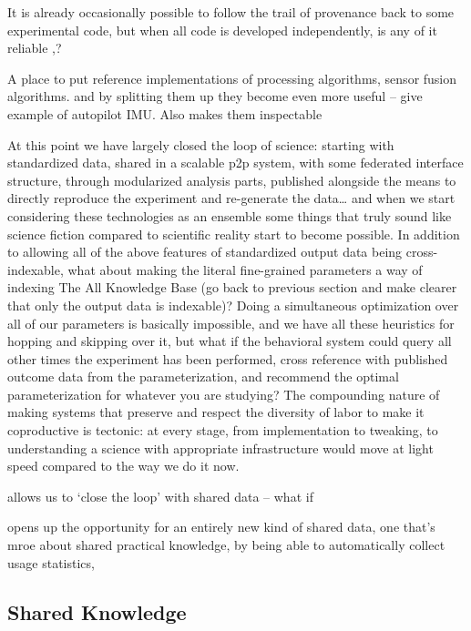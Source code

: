 \documentclass[nohyper]{tufte-book-jls}
\begin{document}
It is already occasionally possible to follow the trail of provenance
back to some experimental code, but when all code is developed
independently, is any of it reliable \cite{wallReliabilityStartsExperimental2018},?
\begin{leftbar}
A place to put reference implementations of processing algorithms,
sensor fusion algorithms. and by splitting them up they become even more
useful -- give example of autopilot IMU. Also makes them inspectable
\end{leftbar}

At this point we have largely closed the loop of science: starting with
standardized data, shared in a scalable p2p system, with some federated
interface structure, through modularized analysis parts, published
alongside the means to directly reproduce the experiment and re-generate
the data\ldots{} and when we start considering these technologies as an
ensemble some things that truly sound like science fiction compared to
scientific reality start to become possible. In addition to allowing all
of the above features of standardized output data being cross-indexable,
what about making the literal fine-grained parameters a way of indexing
The All Knowledge Base (go back to previous section and make clearer
that only the output data is indexable)? Doing a simultaneous
optimization over all of our parameters is basically impossible, and we
have all these heuristics for hopping and skipping over it, but what if
the behavioral system could query all other times the experiment has
been performed, cross reference with published outcome data from the
parameterization, and recommend the optimal parameterization for
whatever you are studying? The compounding nature of making systems that
preserve and respect the diversity of labor to make it coproductive is
tectonic: at every stage, from implementation to tweaking, to
understanding a science with appropriate infrastructure would move at
light speed compared to the way we do it now.

\begin{leftbar}
allows us to `close the loop' with shared data -- what if
\end{leftbar}

\begin{leftbar}
opens up the opportunity for an entirely new kind of shared data, one
that's mroe about shared practical knowledge, by being able to
automatically collect usage statistics,
\end{leftbar}

\hypertarget{shared-knowledge}{%
\subsection{Shared Knowledge}\label{shared-knowledge}}
\end{document}
